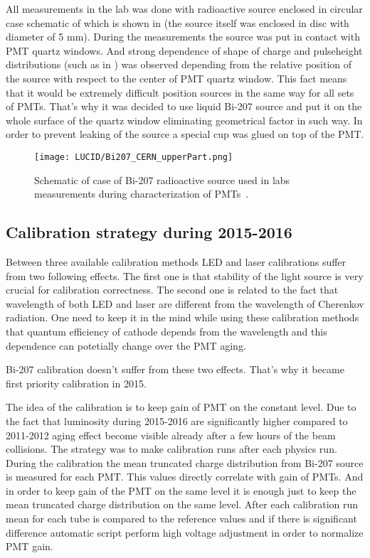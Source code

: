 All measurements in the lab was done with radioactive source enclosed in circular case schematic of which is shown in  
(the source itself was enclosed in disc with diameter of 5 mm).
During the measurements the source was put in contact with PMT quartz windows.
And strong dependence of shape of charge and pulseheight distributions (such as in ) 
was observed depending from the relative position of the source with respect to the center of PMT quartz window.
This fact means that it would be extremely difficult position sources in the same way for all sets of PMTs.
That's why it was decided to use liquid Bi-207 source and put it on the whole surface of the quartz window eliminating geometrical factor in such way.
In order to prevent leaking of the source a special cup was glued on top of the PMT.
 
\begin{figure}
\centering
\texttt{[image: LUCID/Bi207\_CERN\_upperPart.png]}
\caption{Schematic of case of Bi-207 radioactive source used in labs measurements during characterization of PMTs~\cite{Alberghi:2016tad}.}
\label{fig:Bi207_case}
\end{figure}





\subsection{Calibration strategy during 2015-2016}
\label{subsec:calibPerformance}

Between three available calibration methods LED and laser calibrations suffer from two following effects.
The first one is that stability of the light source is very crucial for calibration correctness.
The second one is related to the fact that wavelength of both LED and laser are different from the 
wavelength of Cherenkov radiation. 
One need to keep it in the mind while using these calibration methods that quantum efficiency of cathode depends from the wavelength 
and this dependence can potetially change over the PMT aging.


Bi-207 calibration doesn't suffer from these two effects. That's why it became first priority calibration in 2015.


The idea of the calibration is to keep gain of PMT on the constant level.
Due to the fact that luminosity during 2015-2016 are significantly higher compared to 2011-2012
aging effect become visible already after a few hours of the beam collisions.
The strategy was to make calibration runs after each physics run.
During the calibration the mean truncated charge distribution from Bi-207 source is measured for each PMT.
This values directly correlate with gain of PMTs. 
And in order to keep gain of the PMT on the same level it is enough just to keep the mean truncated charge distribution on the same level.
After each calibration run mean for each tube is compared to the reference values and if there is significant difference automatic script perform 
high voltage adjustment in order to normalize PMT gain.

